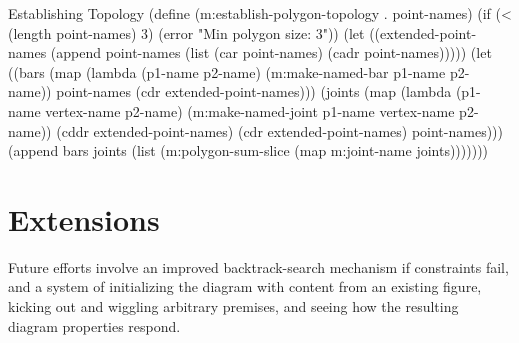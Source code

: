 \begin{code-listing}{Establishing Topology}
(define (m:establish-polygon-topology . point-names)
  (if (< (length point-names) 3)
      (error "Min polygon size: 3"))
  (let ((extended-point-names
         (append point-names
                 (list (car point-names) (cadr point-names)))))
    (let ((bars
           (map (lambda (p1-name p2-name)
                  (m:make-named-bar p1-name p2-name))
                point-names
                (cdr extended-point-names)))
          (joints
           (map (lambda (p1-name vertex-name p2-name)
                  (m:make-named-joint p1-name vertex-name p2-name))
                (cddr extended-point-names)
                (cdr extended-point-names)
                point-names)))
      (append bars joints
              (list (m:polygon-sum-slice
                     (map m:joint-name joints)))))))
\end{code-listing}

\section{Extensions}

Future efforts involve an improved backtrack-search mechanism if
constraints fail, and a system of initializing the diagram with
content from an existing figure, kicking out and wiggling arbitrary
premises, and seeing how the resulting diagram properties respond.
